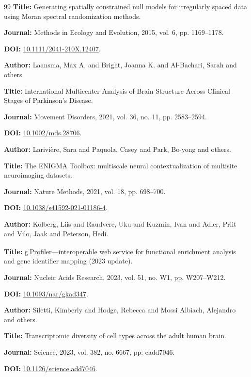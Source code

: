 \documentclass[10pt,twocolumn]{article}
\begin{document}
\begin{thebibliography}{99}
\textbf{Title:} Generating spatially constrained null models for irregularly spaced data using Moran spectral randomization methods.

\textbf{Journal:} Methods in Ecology and Evolution, 2015, vol. 6, pp. 1169--1178.

\textbf{DOI:} \href{https://doi.org/10.1111/2041-210X.12407}{10.1111/2041-210X.12407}.

\textbf{Author:} Laansma, Max A. and Bright, Joanna K. and Al-Bachari, Sarah and others.

\textbf{Title:} International Multicenter Analysis of Brain Structure Across Clinical Stages of Parkinson's Disease.

\textbf{Journal:} Movement Disorders, 2021, vol. 36, no. 11, pp. 2583--2594.

\textbf{DOI:} \href{https://doi.org/10.1002/mds.28706}{10.1002/mds.28706}.

\textbf{Author:} Larivi{\`e}re, Sara and Paquola, Casey and Park, Bo-yong and others.

\textbf{Title:} The ENIGMA Toolbox: multiscale neural contextualization of multisite neuroimaging datasets.

\textbf{Journal:} Nature Methods, 2021, vol. 18, pp. 698--700.

\textbf{DOI:} \href{https://doi.org/10.1038/s41592-021-01186-4}{10.1038/s41592-021-01186-4}.

\textbf{Author:} Kolberg, Liis and Raudvere, Uku and Kuzmin, Ivan and Adler, Priit and Vilo, Jaak and Peterson, Hedi.

\textbf{Title:} g\textsuperscript{:}Profiler---interoperable web service for functional enrichment analysis and gene identifier mapping (2023 update).

\textbf{Journal:} Nucleic Acids Research, 2023, vol. 51, no. W1, pp. W207--W212.

\textbf{DOI:} \href{https://doi.org/10.1093/nar/gkad347}{10.1093/nar/gkad347}.

\textbf{Author:} Siletti, Kimberly and Hodge, Rebecca and Mossi Albiach, Alejandro and others.

\textbf{Title:} Transcriptomic diversity of cell types across the adult human brain.

\textbf{Journal:} Science, 2023, vol. 382, no. 6667, pp. eadd7046.

\textbf{DOI:} \href{https://doi.org/10.1126/science.add7046}{10.1126/science.add7046}.


\end{thebibliography}
\end{document}
